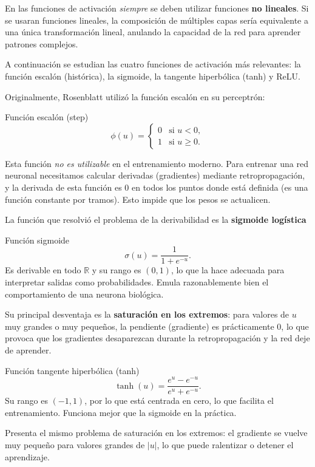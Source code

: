 En las funciones de activación \emph{siempre} se deben utilizar funciones \textbf{no lineales}. Si se usaran funciones lineales, la composición de múltiples capas sería equivalente a una única transformación lineal, anulando la capacidad de la red para aprender patrones complejos.

A continuación se estudian las cuatro funciones de activación más relevantes: la función escalón (histórica), la sigmoide, la tangente hiperbólica (tanh) y ReLU.

Originalmente, Rosenblatt utilizó la función escalón en su perceptrón:

\begin{definicion}
Función escalón (step)
\begin{equation}
\label{eq:step}
\phi(u) = 
\begin{cases}
0 & \text{si } u < 0, \\
1 & \text{si } u \geq 0.
\end{cases}
\end{equation}
\end{definicion}
Esta función \emph{no es utilizable} en el entrenamiento moderno. Para entrenar una red neuronal necesitamos calcular derivadas (gradientes) mediante retropropagación, y la derivada de esta función es $0$ en todos los puntos donde está definida (es una función constante por tramos). Esto impide que los pesos se actualicen.

La función que resolvió el problema de la derivabilidad es la \textbf{sigmoide logística}
\begin{definicion}
Función sigmoide
\begin{equation}
\label{eq:sigmoide}
\sigma(u) = \frac{1}{1 + e^{-u}}.
\end{equation}
Es derivable en todo $\mathbb{R}$ y su rango es $(0, 1)$, lo que la hace adecuada para interpretar salidas como probabilidades. Emula razonablemente bien el comportamiento de una neurona biológica.
\end{definicion}
Su principal desventaja es la \textbf{saturación en los extremos}: para valores de $u$ muy grandes o muy pequeños, la pendiente (gradiente) es prácticamente $0$, lo que provoca que los gradientes desaparezcan durante la retropropagación y la red deje de aprender.

\begin{definicion}
Función tangente hiperbólica (tanh)
\begin{equation}
\label{eq:tanh}
\tanh(u) = \frac{e^{u} - e^{-u}}{e^{u} + e^{-u}}.
\end{equation}
Su rango es $(-1, 1)$, por lo que está centrada en cero, lo que facilita el entrenamiento. Funciona mejor que la sigmoide en la práctica.
\end{definicion}
Presenta el mismo problema de saturación en los extremos: el gradiente se vuelve muy pequeño para valores grandes de $|u|$, lo que puede ralentizar o detener el aprendizaje.

